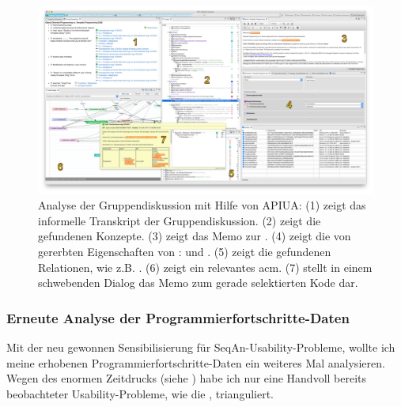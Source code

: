 \begin{figure}
\begin{minipage}{\textwidth}
  \centering
    \includegraphics[width=1.0\linewidth]{Figures/research/workflow-gd.png}
  \caption[Analyse der Gruppendiskussion mit Hilfe von APIUA]{Analyse der Gruppendiskussion mit Hilfe von APIUA: (1) zeigt das informelle Transkript der Gruppendiskussion. (2) zeigt die gefundenen Konzepte. (3) zeigt das Memo zur . (4) zeigt die von  gererbten Eigenschaften von :  und . (5) zeigt die gefundenen Relationen, wie z.B. . (6) zeigt ein relevantes \gls{acm}. (7) stellt in einem schwebenden Dialog das Memo zum gerade selektierten Kode  dar.}
  \label{fig:research-workflow-gd}
\end{minipage}
\end{figure}



\subsubsection{Erneute Analyse der Programmierfortschritte-Daten}

Mit der neu gewonnen Sensibilisierung für SeqAn-Usability-Probleme, wollte ich meine erhobenen Programmierfortschritte-Daten ein weiteres Mal analysieren. Wegen des enormen Zeitdrucks (siehe ) habe ich nur eine Handvoll bereits beobachteter Usability-Probleme, wie die , trianguliert.


